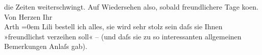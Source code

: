 \begin{ledgroupsized}[t]{13cm}
                    die Zeiten weiterschwingt.\pend
           \pstart
           Auf Wiedersehen also, sobald freundlichere Tage ko{\geminationm}en.\pend
           \pstart
           Von Herzen Ihr{\\[\baselineskip]}\spacefill\mbox{Arth}\pend
           \leftskip=0em{}\pstart
           \noindent{}Lili bestell ich alles, sie wird sehr
                        stolz sein daſs sie Ihnen »freundlichst verzeihen soll« – (und daſs sie zu
                        so interessanten allgemeinen Bemerkungen Anlaſs gab).\pend
           \endnumbering{}\end{ledgroupsized}  \newcommand{\dateiname}{L02467}\newcommand{\titel}{Arthur Schnitzler an Hugo Hofmannsthal, 11. 3. 1926}\newcommand{\editorInnen}{Martin Anton Müller und Gerd-Hermann Susen}
      